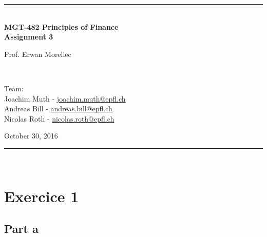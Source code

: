 \documentclass[a4paper,11pt,twoside]{article}
\newcommand{\mail}[1]{{\href{mailto:#1}{#1}}}
\begin{document}
\begin{titlepage} %
\begin{center}
\newcommand{\HRule}{\rule{\linewidth}{0.5mm}} %
\center %
 
 




\begin{figure} [h] %
\centerline{
} 
\end{figure}

\HRule \\[0.4cm]
{ \huge \bfseries MGT-482 Principles of Finance \\Assignment 3}\\[0.4cm] %

\begin{minipage}[t]{0.4\textwidth}
\flushleft
Prof. Erwan Morellec
\end{minipage}
~
\begin{minipage}[t]{0.55\textwidth}
\flushright
Team: \\
Joachim Muth - \mail{joachim.muth@epfl.ch}\\
Andreas Bill - \mail{andreas.bill@epfl.ch}\\
Nicolas Roth - \mail{nicolas.roth@epfl.ch}\\
\end{minipage}
\begin{center}
October 30, 2016
\end{center}
\HRule \\

\end{center}
\end{titlepage}



\pagestyle{fancy}

\section*{Exercice 1}
\subsection*{Part a}
\end{document}
